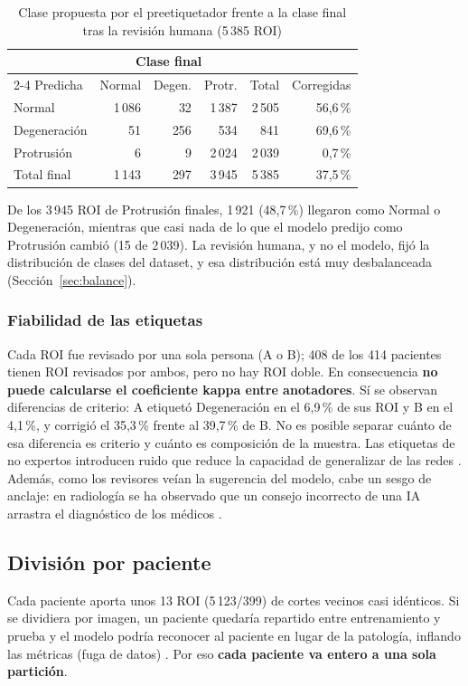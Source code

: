 \begin{table}[!htb]
\centering\footnotesize
\setlength{\tabcolsep}{3.5pt}
\caption{Clase propuesta por el preetiquetador frente a la clase final tras la revisión humana (5\,385 ROI)}
\label{tab:reetiquetado}
\begin{tabular}{lrrrrr}
\toprule
 & \multicolumn{3}{c}{Clase final} & & \\
\cmidrule(lr){2-4}
Predicha & Normal & Degen. & Protr. & Total & Corregidas \\
\midrule
Normal       & 1\,086 & 32  & 1\,387 & 2\,505 & 56,6\,\% \\
Degeneración & 51     & 256 & 534    & 841    & 69,6\,\% \\
Protrusión   & 6      & 9   & 2\,024 & 2\,039 & 0,7\,\% \\
\midrule
Total final  & 1\,143 & 297 & 3\,945 & 5\,385 & 37,5\,\% \\
\bottomrule
\end{tabular}
\end{table}

De los 3\,945 ROI de Protrusión finales, 1\,921 (48,7\,\%) llegaron como Normal o Degeneración, mientras que casi nada de lo que el modelo predijo como Protrusión cambió (15 de 2\,039). La revisión humana, y no el modelo, fijó la distribución de clases del dataset, y esa distribución está muy desbalanceada (Sección~\ref{sec:balance}).

\subsubsection{Fiabilidad de las etiquetas}
Cada ROI fue revisado por una sola persona (A o B); 408 de los 414 pacientes tienen ROI revisados por ambos, pero no hay ROI doble. En consecuencia \textbf{no puede calcularse el coeficiente kappa entre anotadores}. Sí se observan diferencias de criterio: A etiquetó Degeneración en el 6,9\,\% de sus ROI y B en el 4,1\,\%, y corrigió el 35,3\,\% frente al 39,7\,\% de B. No es posible separar cuánto de esa diferencia es criterio y cuánto es composición de la muestra. Las etiquetas de no expertos introducen ruido que reduce la capacidad de generalizar de las redes \cite{shi2024}. Además, como los revisores veían la sugerencia del modelo, cabe un sesgo de anclaje: en radiología se ha observado que un consejo incorrecto de una IA arrastra el diagnóstico de los médicos \cite{prinster2024}.

\subsection{División por paciente}
\label{sec:split}
Cada paciente aporta unos 13 ROI (5\,123/399) de cortes vecinos casi idénticos. Si se dividiera por imagen, un paciente quedaría repartido entre entrenamiento y prueba y el modelo podría reconocer al paciente en lugar de la patología, inflando las métricas (fuga de datos) \cite{brunekreef2024,rumala2023}. Por eso \textbf{cada paciente va entero a una sola partición}.

